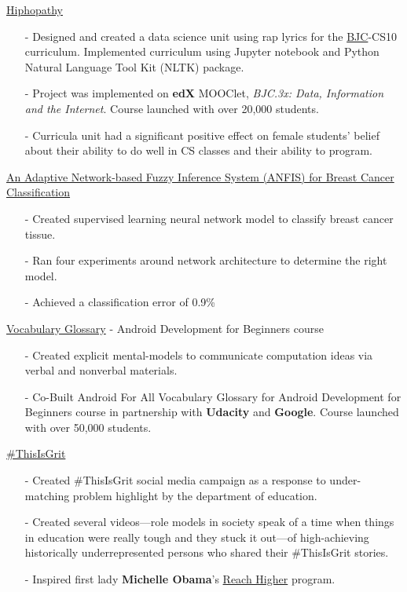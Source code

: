 \documentclass[11pt,article,oneside]{memoir}
\begin{document}
\ind \href{https://github.com/omoju/hiphopathy}{Hiphopathy}
\begin{itemize}[noitemsep,nolistsep]
\item[-] Designed and created a data science unit using rap lyrics for the \href{http://bjc.berkeley.edu/}{BJC}-CS10 curriculum. Implemented curriculum using Jupyter notebook and Python Natural Language Tool Kit (NLTK) package.
\item[-] Project was implemented on \textbf{edX} MOOClet, \textit{BJC.3x: Data, Information and the Internet}. Course launched with over 20,000 students.
\item[-] Curricula unit had a significant positive effect on female students' belief about their ability to do well in CS classes and their ability to program.
\end{itemize} 

\ind \href{https://github.com/omoju/Anfis}{An Adaptive Network-based Fuzzy Inference System (ANFIS) for Breast Cancer Classification}
\begin{itemize}[noitemsep,nolistsep]
\item[-] Created supervised learning neural network model to classify breast cancer tissue. 
\item[-] Ran four experiments around network architecture to determine the right model.
\item[-] Achieved a classification error of 0.9\%
\end{itemize} 

\ind \href{https://developers.google.com/android/for-all/vocab-words/}{Vocabulary Glossary} - Android Development for Beginners course
\begin{itemize}[noitemsep,nolistsep]
\item[-] Created explicit mental-models to communicate computation ideas via verbal and nonverbal materials.
\item[-] Co-Built Android For All Vocabulary Glossary for Android Development for Beginners course in partnership with \textbf{Udacity} and \textbf{Google}. Course launched with over 50,000 students.
\end{itemize} 

\ind \href{https://www.youtube.com/channel/UCZK66JujoN3KY3sak2kEa2w?&ab_channel=ThisIsGRIT}{\#ThisIsGrit}
\begin{itemize}[noitemsep,nolistsep]
\item[-] Created \#ThisIsGrit social media campaign as a response to under-matching problem highlight by the department of education.
\item[-] Created several videos---role models in society speak of a time when things in education were really tough and they stuck it out---of high-achieving historically underrepresented persons who shared their \#ThisIsGrit stories.
\item[-] Inspired first lady \textbf{Michelle Obama}'s \href{https://www.whitehouse.gov/reach-higher}{Reach Higher} program. 
\end{itemize} 
\end{document}
